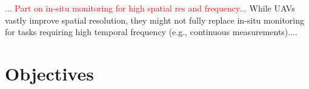 \textcolor{red}{... Part on in-situ monitoring for high spatial res and frequency...}
While UAVs vastly improve spatial resolution, they might not fully replace in-situ monitoring for tasks requiring high temporal frequency 
(e.g., continuous measurements)....






\section{Objectives}

